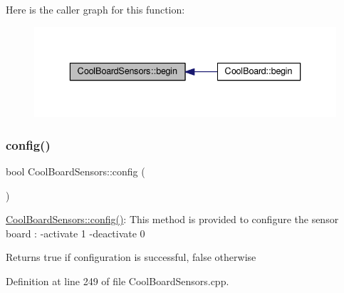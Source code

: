 Here is the caller graph for this function\+:\nopagebreak
\begin{figure}[H]
\begin{center}
\leavevmode
\includegraphics[width=336pt]{de/d46/class_cool_board_sensors_a97095823ef7c8f5290812f1405b966b3_icgraph}
\end{center}
\end{figure}
\mbox{\label{class_cool_board_sensors_a9a218895c5423375c33c08f2c56fb23a}} 
\subsubsection{\texorpdfstring{config()}{config()}}
{\footnotesize\ttfamily bool Cool\+Board\+Sensors\+::config (\begin{DoxyParamCaption}{ }\end{DoxyParamCaption})}

\hyperlink{class_cool_board_sensors_a9a218895c5423375c33c08f2c56fb23a}{Cool\+Board\+Sensors\+::config()}\+: This method is provided to configure the sensor board \+: -\/activate 1 -\/deactivate 0

\begin{DoxyReturn}{Returns}
true if configuration is successful, false otherwise 
\end{DoxyReturn}


Definition at line 249 of file Cool\+Board\+Sensors.\+cpp.


